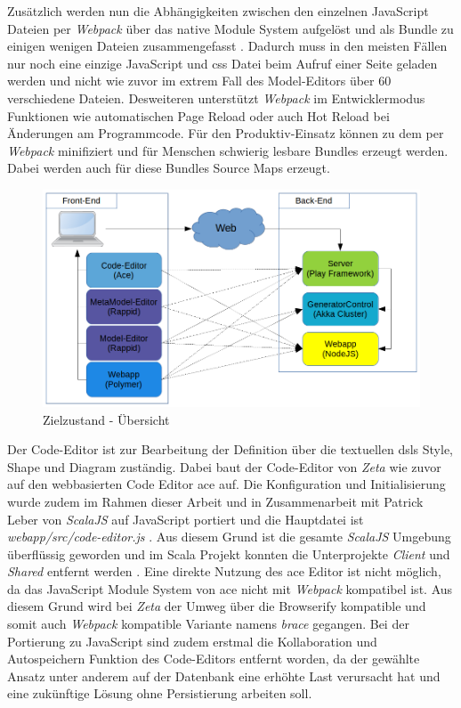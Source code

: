 Zusätzlich werden nun die Abhängigkeiten zwischen den einzelnen JavaScript Dateien per \textit{Webpack} über das native Module System aufgelöst und als Bundle zu einigen wenigen Dateien zusammengefasst \cite{zeta_webpack_bundle,zeta_commit_resolve_via_webpack}. Dadurch muss in den meisten Fällen nur noch eine einzige JavaScript und \ac{css} Datei beim Aufruf einer Seite geladen werden und nicht wie zuvor im extrem Fall des Model-Editors über 60 verschiedene Dateien. Desweiteren unterstützt \textit{Webpack} im Entwicklermodus Funktionen wie automatischen Page Reload oder auch Hot Reload bei Änderungen am Programmcode. Für den Produktiv-Einsatz können zu dem per \textit{Webpack} minifiziert und für Menschen schwierig lesbare Bundles erzeugt werden. Dabei werden auch für diese Bundles Source Maps erzeugt.

\begin{figure}
    \centering
    \includegraphics[width=5in]{figures/overview-final.png}
    \caption{Zielzustand - Übersicht}
    \label{fig:ZETA_OVERVIEW_NEW}
\end{figure}

Der Code-Editor ist zur Bearbeitung der Definition über die textuellen \acp{dsl} Style, Shape und Diagram zuständig. Dabei baut der Code-Editor von \textit{Zeta} wie zuvor auf den webbasierten Code Editor \ac{ace} auf. Die Konfiguration und Initialisierung wurde zudem im Rahmen dieser Arbeit und in Zusammenarbeit mit Patrick Leber von \textit{ScalaJS} auf JavaScript portiert und die Hauptdatei ist \textit{webapp/src/code-editor.js} \cite{zeta_code_editor,zeta_commit_code_editor}. Aus diesem Grund ist die gesamte \textit{ScalaJS} Umgebung überflüssig geworden und im Scala Projekt konnten die Unterprojekte \textit{Client} und \textit{Shared} entfernt werden \cite{zeta_commit_remove_sbt_client,zeta_commit_remove_sbt_shared}. Eine direkte Nutzung des \ac{ace} Editor ist nicht möglich, da das JavaScript Module System von \ac{ace} nicht mit \textit{Webpack} kompatibel ist. Aus diesem Grund wird bei \textit{Zeta} der Umweg über die Browserify kompatible und somit auch \textit{Webpack} kompatible Variante namens \textit{brace} gegangen. Bei der Portierung zu JavaScript sind zudem erstmal die Kollaboration und Autospeichern Funktion des Code-Editors entfernt worden, da der gewählte Ansatz unter anderem auf der Datenbank eine erhöhte Last verursacht hat und eine zukünftige Lösung ohne Persistierung arbeiten soll.

